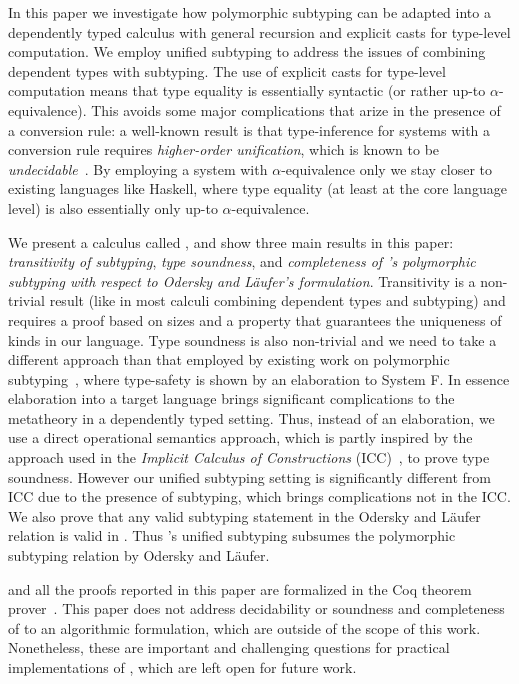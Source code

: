 In this paper we investigate how polymorphic subtyping can be
adapted into a dependently typed calculus with general recursion and
explicit casts for type-level computation. We employ unified subtyping
to address the issues of combining dependent types with subtyping.
The use of explicit casts
for type-level computation means that type equality is essentially
syntactic (or rather up-to $\alpha$-equivalence).
This avoids some major complications that arize in the presence
of a conversion rule:
a well-known result is that type-inference for systems
with a conversion rule requires \emph{higher-order
  unification}, which is known to be \emph{undecidable}~\cite{goldfarb1981undecidability}.
By employing a system with $\alpha$-equivalence only we stay closer to existing
languages like Haskell, where type equality (at least at the core language level)
is also essentially only up-to $\alpha$-equivalence.

We present a calculus called \name, and show three main results in this paper:
\emph{transitivity of subtyping}, \emph{type soundness}, and \emph{completeness
of \name's polymorphic subtyping with respect to Odersky and L\"aufer's formulation}.
Transitivity is a non-trivial result (like in most calculi combining dependent types
and subtyping) and requires a proof based on sizes and a property that guarantees
the uniqueness of kinds in our language. Type soundness is also non-trivial and we need
to take a different approach than that employed by existing work on polymorphic
subtyping~\cite{odersky1996putting, jones2007practical}, where type-safety is shown by an
elaboration to System F. In essence elaboration into a target language
brings significant complications to the metatheory in a dependently typed setting.
Thus, instead of an elaboration, we use a direct operational semantics approach, which
is partly inspired by the approach used in the \emph{Implicit Calculus of Constructions} (ICC)~\cite{miquel2001implicit,barras2008implicit},
to prove type soundness. However our unified subtyping setting is significantly
different from ICC due to the presence of subtyping, which brings complications not in the ICC.
We also prove that any valid subtyping statement in the Odersky and L\"aufer relation
is valid in \name. Thus \name's unified subtyping subsumes the polymorphic subtyping
relation by Odersky and L\"aufer.

\name and all the proofs reported in this paper are formalized in the Coq theorem
prover~\cite{coq}.
This paper
does not address decidability or soundness and completeness of \name to an
algorithmic formulation, which are outside of the scope of this work.
Nonetheless, these are important and challenging
questions for practical implementations of \name, which are left open for future work.

